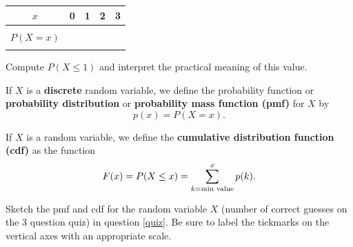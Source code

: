 \begin{center}
\begin{tabular}{|c|c|c|c|c|}
\hline
$x$ & \hspace{0.25in} 0  \hspace{0.25in} &  \hspace{0.25in} 1  \hspace{0.25in} &  \hspace{0.25in} 2  \hspace{0.25in} &  \hspace{0.25in} 3  \hspace{0.25in} \\
\hline
 & & & & \\
$P(X=x)$ & & & & \\
 & & & & \\
\hline
\end{tabular}
\end{center}

\ii Compute $P(X \leq 1)$ and interpret the practical meaning of this value.
\ee
\ee

\clearpage


\begin{tcolorbox}
\begin{definition}\label{def:pmf}
If $X$ is a \textbf{\alert{discrete}} random variable, we define the probability function or \textbf{\alert{probability distribution}} or \textbf{\alert{probability mass function (pmf)}}
for $X$ by
\[ p(x) = P(X=x) .\]
\end{definition}

\vspace{-0.25in}

\begin{definition}\label{def:cdf1}
If $X$ is a random variable, we define the \textbf{\alert{cumulative distribution function (cdf)}} as the function
\[ F(x)=P(X \leq x) = \sum_{k=\mbox{\scriptsize{min value}}}^x p(k) .\]
\end{definition}
\end{tcolorbox}


\bb[resume]
\ii Sketch the pmf and cdf for the random variable $X$ (number of correct guesses on the 3 question quiz) in question \ref{quiz}. Be sure to label the tickmarks on the vertical axes with an appropriate scale.

